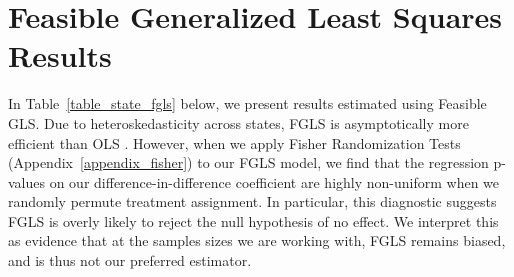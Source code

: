 \documentclass[12pt]{article}
\begin{document}
\clearpage \newpage
\section{Feasible Generalized Least Squares Results}\label{appendix_fgls}
\setcounter{table}{0}
\setcounter{figure}{0}
\renewcommand{\thetable}{K\arabic{table}}
\renewcommand{\thefigure}{K\arabic{figure}}
\normalsize

In Table~\ref{table_state_fgls} below, we present results estimated using Feasible GLS. Due to heteroskedasticity across states, FGLS is asymptotically more efficient than OLS \citep{Cameron:2005vy}. However, when we apply Fisher Randomization Tests (Appendix~\ref{appendix_fisher}) to our FGLS model, we find that the regression p-values on our difference-in-difference coefficient are highly non-uniform when we randomly permute treatment assignment. In particular, this diagnostic suggests FGLS is overly likely to reject the null hypothesis of no effect. We interpret this as evidence that at the samples sizes we are working with, FGLS remains biased, and is thus not our preferred estimator.
\end{document}
